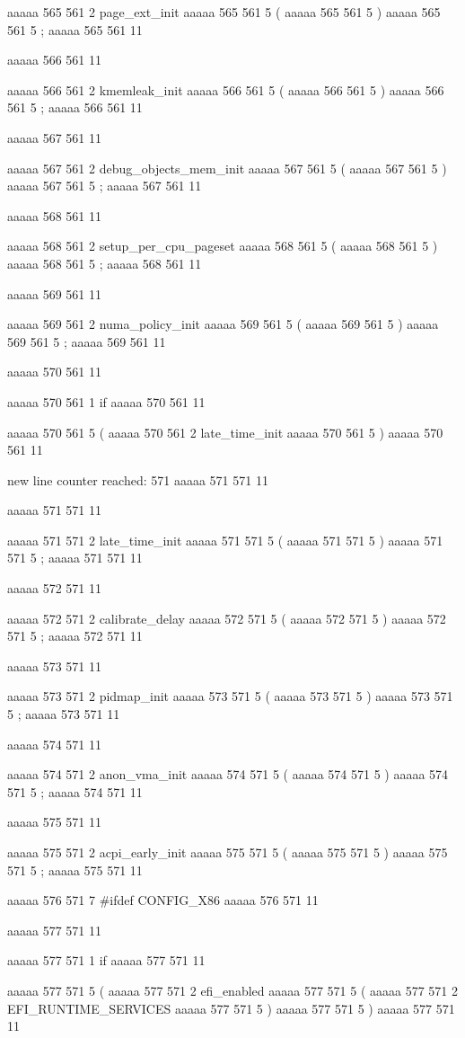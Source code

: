 {aaaaa 565 561
2
page_ext_init
aaaaa 565 561
5
(
aaaaa 565 561
5
)
aaaaa 565 561
5
;
aaaaa 565 561
11


aaaaa 566 561
11
	
aaaaa 566 561
2
kmemleak_init
aaaaa 566 561
5
(
aaaaa 566 561
5
)
aaaaa 566 561
5
;
aaaaa 566 561
11


aaaaa 567 561
11
	
aaaaa 567 561
2
debug_objects_mem_init
aaaaa 567 561
5
(
aaaaa 567 561
5
)
aaaaa 567 561
5
;
aaaaa 567 561
11


aaaaa 568 561
11
	
aaaaa 568 561
2
setup_per_cpu_pageset
aaaaa 568 561
5
(
aaaaa 568 561
5
)
aaaaa 568 561
5
;
aaaaa 568 561
11


aaaaa 569 561
11
	
aaaaa 569 561
2
numa_policy_init
aaaaa 569 561
5
(
aaaaa 569 561
5
)
aaaaa 569 561
5
;
aaaaa 569 561
11


aaaaa 570 561
11
	
aaaaa 570 561
1
if
aaaaa 570 561
11
 
aaaaa 570 561
5
(
aaaaa 570 561
2
late_time_init
aaaaa 570 561
5
)
aaaaa 570 561
11


new line counter reached: 571
aaaaa 571 571
11
	
aaaaa 571 571
11
	
aaaaa 571 571
2
late_time_init
aaaaa 571 571
5
(
aaaaa 571 571
5
)
aaaaa 571 571
5
;
aaaaa 571 571
11


aaaaa 572 571
11
	
aaaaa 572 571
2
calibrate_delay
aaaaa 572 571
5
(
aaaaa 572 571
5
)
aaaaa 572 571
5
;
aaaaa 572 571
11


aaaaa 573 571
11
	
aaaaa 573 571
2
pidmap_init
aaaaa 573 571
5
(
aaaaa 573 571
5
)
aaaaa 573 571
5
;
aaaaa 573 571
11


aaaaa 574 571
11
	
aaaaa 574 571
2
anon_vma_init
aaaaa 574 571
5
(
aaaaa 574 571
5
)
aaaaa 574 571
5
;
aaaaa 574 571
11


aaaaa 575 571
11
	
aaaaa 575 571
2
acpi_early_init
aaaaa 575 571
5
(
aaaaa 575 571
5
)
aaaaa 575 571
5
;
aaaaa 575 571
11


aaaaa 576 571
7
#ifdef CONFIG_X86
aaaaa 576 571
11


aaaaa 577 571
11
	
aaaaa 577 571
1
if
aaaaa 577 571
11
 
aaaaa 577 571
5
(
aaaaa 577 571
2
efi_enabled
aaaaa 577 571
5
(
aaaaa 577 571
2
EFI_RUNTIME_SERVICES
aaaaa 577 571
5
)
aaaaa 577 571
5
)
aaaaa 577 571
11


}
